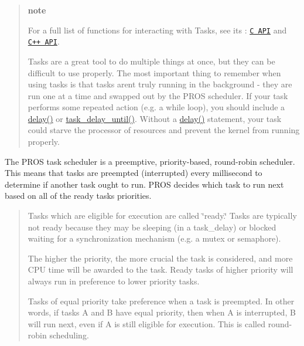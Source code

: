 \begin{quote}
{\bfseries note}

For a full list of functions for interacting with Tasks, see its \+: \href{../../api/c/rtos.html}{\tt C A\+PI} and \href{../../api/cpp/rtos.html}{\tt C++ A\+PI}.

Tasks are a great tool to do multiple things at once, but they can be difficult to use properly. The most important thing to remember when using tasks is that tasks aren\textquotesingle{}t truly running in the background -\/ they are run one at a time and swapped out by the P\+R\+OS scheduler. If your task performs some repeated action (e.\+g. a {\ttfamily while} loop), you should include a {\ttfamily \hyperlink{rtos_8h_ab8c5a8048d5576a33d7f79b95a2fa0dd}{delay()}} or {\ttfamily \hyperlink{rtos_8h_a61c8ccf83a0dc79fc0e9fde5e87a0329}{task\+\_\+delay\+\_\+until()}}. Without a {\ttfamily \hyperlink{rtos_8h_ab8c5a8048d5576a33d7f79b95a2fa0dd}{delay()}} statement, your task could starve the processor of resources and prevent the kernel from running properly. \end{quote}


The P\+R\+OS task scheduler is a preemptive, priority-\/based, round-\/robin scheduler. This means that tasks are preempted (interrupted) every millisecond to determine if another task ought to run. P\+R\+OS decides which task to run next based on all of the ready tasks\textquotesingle{} priorities.

\begin{quote}

\begin{DoxyItemize}
\item Tasks which are eligible for execution are called \char`\"{}ready.\char`\"{} Tasks are typically not ready because they may be sleeping (in a {\ttfamily task\+\_\+delay}) or blocked waiting for a synchronization mechanism (e.\+g. a mutex or semaphore).
\item The higher the priority, the more crucial the task is considered, and more C\+PU time will be awarded to the task. Ready tasks of higher priority will always run in preference to lower priority tasks.
\item Tasks of equal priority take preference when a task is preempted. In other words, if tasks A and B have equal priority, then when A is interrupted, B will run next, even if A is still eligible for execution. This is called round-\/robin scheduling. 
\end{DoxyItemize}\end{quote}


